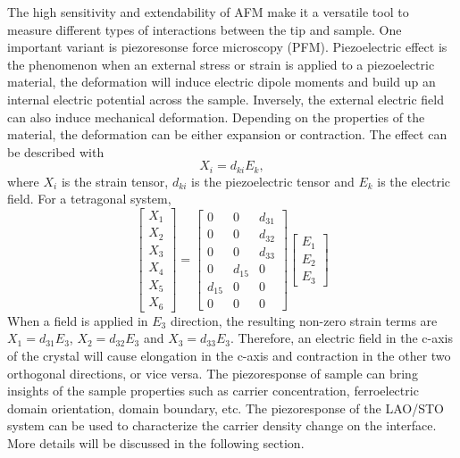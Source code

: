 \documentclass[pdflatex, sectionletters, 12pt]{pittetd}    %
\begin{document}
The high sensitivity and extendability of AFM make it a versatile tool to measure different types of interactions between the tip and sample. One important variant is piezoresonse force microscopy (PFM). Piezoelectric effect is the phenomenon when an external stress or strain is applied to a piezoelectric material, the deformation will induce electric dipole moments and build up an internal electric potential across the sample. Inversely, the external electric field can also induce mechanical deformation. Depending on the properties of the material, the deformation can be either expansion or contraction. The effect can be described with
$$
X_i = d_{ki}E_k,
$$
where $X_i$ is the strain tensor, $d_{ki}$ is the piezoelectric tensor and $E_k$ is the electric field. For a tetragonal system, 
$$
\begin{bmatrix}
X_{1} \\
X_{2} \\
X_{3} \\
X_{4} \\
X_{5} \\
X_{6}
\end{bmatrix} =
\begin{bmatrix}
0 & 0 & d_{31} \\
0 & 0 & d_{32} \\
0 & 0 & d_{33} \\
0 & d_{15} & 0 \\
d_{15} & 0 & 0 \\
0 & 0 & 0
\end{bmatrix}
\begin{bmatrix}
E_{1} \\
E_{2} \\
E_{3}
\end{bmatrix}
$$
When a field is applied in $E_3$ direction, the resulting non-zero strain terms are $X_1 = d_{31}E_3$, $X_2 = d_{32}E_3$ and $X_3 = d_{33}E_3$. Therefore, an electric field in the c-axis of the crystal will cause elongation in the c-axis and contraction in the other two orthogonal directions, or vice versa. The piezoresponse of sample can bring insights of the sample properties such as carrier concentration\cite{huang2013direct}, ferroelectric domain orientation\cite{soergel2011piezoresponse}, domain boundary\cite{potnis2011review}, etc. The piezoresponse of the LAO/STO system can be used to characterize the carrier density change on the interface. More details will be discussed in the following section.
\end{document}
